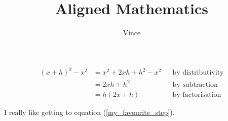 \documentclass{article}
\title{Aligned Mathematics}
\author{Vince}
\begin{document}
\maketitle

\begin{align}
    (x + h) ^ 2 - x ^ 2 & = x ^ 2 + 2 x h + h ^ 2 - x ^ 2 && \text{by distributivity} \\
                        & = 2xh + h ^ 2 && \text{by subtraction}\nonumber\\
                        & = h(2x+h) && \text{by factorisation}\label{my_favourite_step}
\end{align}

I really like getting to equation (\ref{my_favourite_step}).
\end{document}
